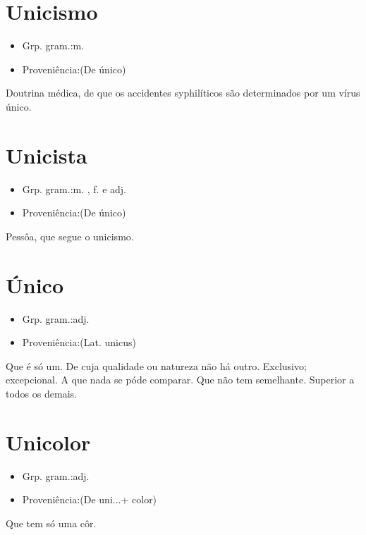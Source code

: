 \documentclass{article}
\begin{document}
\section{Unicismo}
\begin{itemize}
\item {Grp. gram.:m.}
\end{itemize}
\begin{itemize}
\item {Proveniência:(De \textunderscore único\textunderscore )}
\end{itemize}
Doutrina médica, de que os accidentes syphilíticos são determinados por um vírus único.
\section{Unicista}
\begin{itemize}
\item {Grp. gram.:m. ,  f.  e  adj.}
\end{itemize}
\begin{itemize}
\item {Proveniência:(De \textunderscore único\textunderscore )}
\end{itemize}
Pessôa, que segue o unicismo.
\section{Único}
\begin{itemize}
\item {Grp. gram.:adj.}
\end{itemize}
\begin{itemize}
\item {Proveniência:(Lat. \textunderscore unicus\textunderscore )}
\end{itemize}
Que é só um.
De cuja qualidade ou natureza não há outro.
Exclusivo; excepcional.
A que nada se póde comparar.
Que não tem semelhante.
Superior a todos os demais.
\section{Unicolor}
\begin{itemize}
\item {Grp. gram.:adj.}
\end{itemize}
\begin{itemize}
\item {Proveniência:(De \textunderscore uni...\textunderscore  + \textunderscore color\textunderscore )}
\end{itemize}
Que tem só uma côr.
\end{document}
